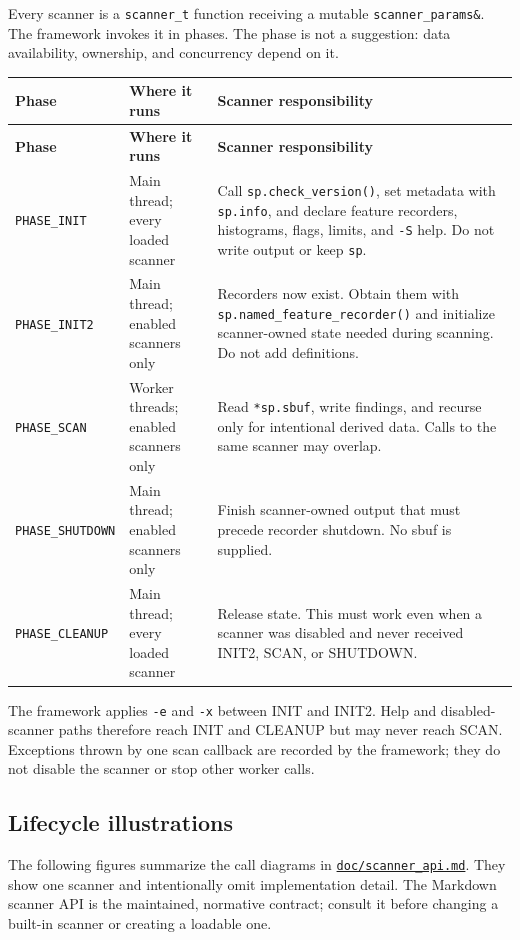 \documentclass[11pt]{article}
\newcommand{\code}[1]{\texttt{#1}}
\begin{document}
Every scanner is a \code{scanner\_t} function receiving a mutable
\code{scanner\_params\&}. The framework invokes it in phases. The phase is
not a suggestion: data availability, ownership, and concurrency depend on it.

\begin{longtable}{|p{.20\linewidth}|p{.24\linewidth}|p{.46\linewidth}|}
\hline
\textbf{Phase} & \textbf{Where it runs} & \textbf{Scanner responsibility} \\
\hline
\endfirsthead
\hline
\textbf{Phase} & \textbf{Where it runs} & \textbf{Scanner responsibility} \\
\hline
\endhead
\code{PHASE\_INIT} & Main thread; every loaded scanner & Call
\code{sp.check\_version()}, set metadata with \code{sp.info}, and declare
feature recorders, histograms, flags, limits, and \code{-S} help. Do not write
output or keep \code{sp}. \\
\hline
\code{PHASE\_INIT2} & Main thread; enabled scanners only & Recorders now
exist. Obtain them with \code{sp.named\_feature\_recorder()} and initialize
scanner-owned state needed during scanning. Do not add definitions. \\
\hline
\code{PHASE\_SCAN} & Worker threads; enabled scanners only & Read
\code{*sp.sbuf}, write findings, and recurse only for intentional derived
data. Calls to the same scanner may overlap. \\
\hline
\code{PHASE\_SHUTDOWN} & Main thread; enabled scanners only & Finish
scanner-owned output that must precede recorder shutdown. No sbuf is supplied. \\
\hline
\code{PHASE\_CLEANUP} & Main thread; every loaded scanner & Release state.
This must work even when a scanner was disabled and never received INIT2, SCAN,
or SHUTDOWN. \\
\hline
\end{longtable}

The framework applies \code{-e} and \code{-x} between INIT and INIT2. Help
and disabled-scanner paths therefore reach INIT and CLEANUP but may never
reach SCAN. Exceptions thrown by one scan callback are recorded by the
framework; they do not disable the scanner or stop other worker calls.

\subsection{Lifecycle illustrations}

The following figures summarize the call diagrams in
\href{https://github.com/simsong/bulk_extractor/blob/main/doc/scanner_api.md}
{\code{doc/scanner\_api.md}}. They show one scanner and intentionally omit
implementation detail. The Markdown scanner API is the maintained, normative
contract; consult it before changing a built-in scanner or creating a loadable
one.
\end{document}
